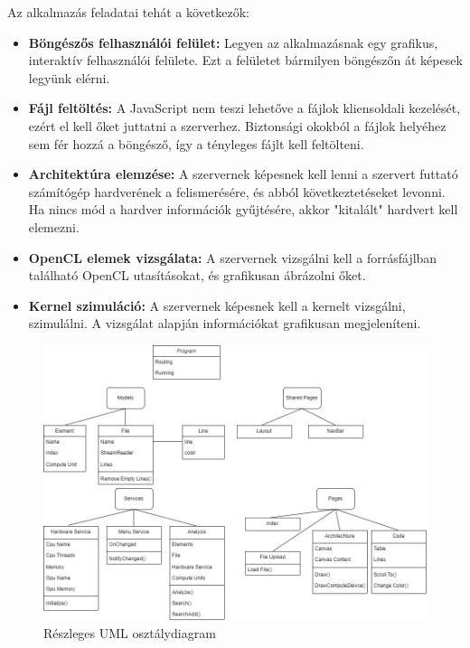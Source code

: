 Az alkalmazás feladatai tehát a következők:
\begin{itemize}
\item\textbf{Böngészős felhasználói felület:} Legyen az alkalmazásnak egy grafikus, interaktív felhasználói felülete. Ezt a felületet bármilyen böngészőn át képesek legyünk elérni.
\item\textbf{Fájl feltöltés:} A JavaScript nem teszi lehetőve a fájlok kliensoldali kezelését, ezért el kell őket juttatni a szerverhez. Biztonsági okokból a fájlok helyéhez sem fér hozzá a böngésző, így a tényleges fájlt kell feltölteni.
\item\textbf{Architektúra elemzése:} A szervernek képesnek kell lenni a szervert futtató számítógép hardverének a felismerésére, és abból következtetéseket levonni. Ha nincs mód a hardver információk gyűjtésére, akkor "kitalált" hardvert kell elemezni.
\item\textbf{OpenCL elemek vizsgálata:} A szervernek vizsgálni kell a forrásfájlban található OpenCL utasításokat, és grafikusan ábrázolni őket.
\item\textbf{Kernel szimuláció:} A szervernek képesnek kell a kernelt vizsgálni, szimulálni. A vizsgálat alapján információkat grafikusan megjeleníteni.
\end{itemize}



\begin{figure}[h]
\centering
\includegraphics[scale=0.4]{images/UML.jpg}
\caption{Részleges UML osztálydiagram}
\label{fig:uml}
\end{figure}

